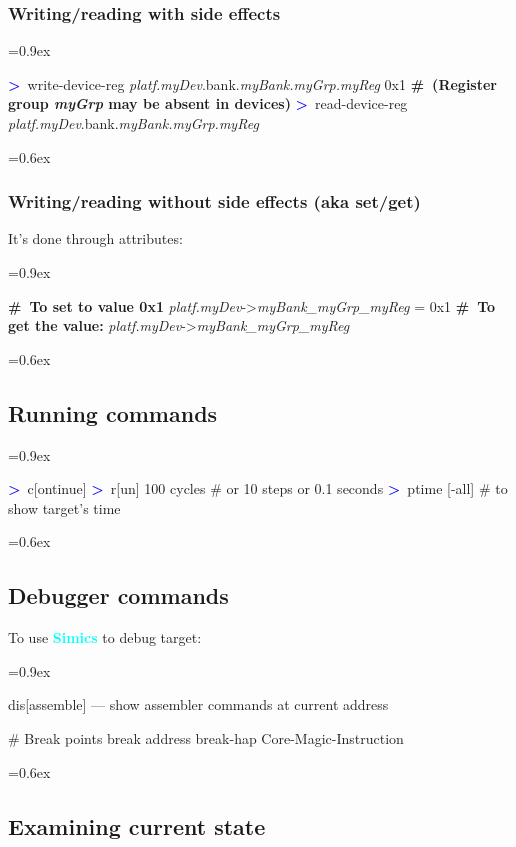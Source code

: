 \documentclass[8pt]{extarticle}
\DeclareRobustCommand{\bseries}{\fontseries{b}\selectfont}
\newenvironment{code}[1][]{%
\begin{prebox}[#1]\obeylines%
\fontdimen2\font=0.9ex%
}{%
\end{prebox}%
\fontdimen2\font=0.6ex%
}
\newcommand{\ind}{\hphantom{~~~}}
\newcommand{\sprompt}{\textcolor{blue}{\textbf{>}\ }}
\newcommand{\cmtcommon}[1]{\textcolor{Sepia}{\textbf{#1}}}
\newcommand{\cmt}[1]{\cmtcommon{\#\ #1}}
\newcommand{\p}[1]{\textit{\large#1}}
\newcommand{\Simics}{\textcolor{cyan}{\textbf{Simics}}}
\begin{document}
\begin{multicols*}{3}
\subsubsection{Writing/reading with side effects}

\begin{code}
    \sprompt write-device-reg
    \ind \ind \p{platf.myDev}.bank.\p{myBank.myGrp.myReg} 0x1
    \cmt{(Register group \p{myGrp} may be absent in devices)}
    \sprompt read-device-reg \p{platf.myDev}.bank.\p{myBank.myGrp.myReg}
\end{code}

\subsubsection{Writing/reading {\bseries without} side effects (aka set/get)}

It's done through attributes:
\begin{code}
    \cmt{To set to value 0x1}
    \p{platf.myDev}->\p{myBank_myGrp_myReg} = 0x1
    \cmt{To get the value:}
    \p{platf.myDev}->\p{myBank_myGrp_myReg}
\end{code}


\subsection{Running commands}
\begin{code}
\sprompt c[ontinue]
\sprompt r[un] 100 cycles \ind \# or 10 steps or 0.1 seconds
\sprompt ptime [-all] \ind \# to show target's time
\end{code}

\subsection{Debugger commands}
To use \Simics{} to debug target:
\begin{code}
dis[assemble] — show assembler commands at current address

\# Break points
break address
break-hap Core-Magic-Instruction
\end{code}

\subsection{Examining current state}


\end{multicols*}
\end{document}
